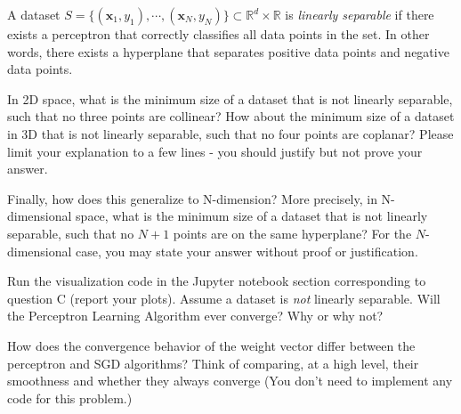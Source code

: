 \begin{problem}[4]
  A dataset $S = \{(\mathbf{x}_1, y_1),\cdots,(\mathbf{x}_N, y_N)\} \subset \mathbb{R}^d \times \mathbb{R}$ is \emph{linearly separable} if there exists a perceptron that correctly classifies all data points in the set. In other words, there exists a hyperplane that separates positive data points and negative data points.

  In 2D space, what is the minimum size of a dataset that is not linearly separable, such that no three points are collinear? How about the minimum size of a dataset in 3D that is not linearly separable, such that no four points are coplanar? Please limit your explanation to a few lines - you should justify but not prove your answer.

  Finally, how does this generalize to N-dimension? More precisely, in N-dimensional space, what is the minimum size of a dataset that is not linearly separable, such that no $N+1$ points are on the same hyperplane? For the $N$-dimensional case, you may state your answer without proof or justification.
\end{problem}
\begin{solution}

\end{solution}

\begin{problem}[2]
  Run the visualization code in the Jupyter notebook section corresponding to question C (report your plots). Assume a dataset is \emph{not} linearly separable. Will the Perceptron Learning Algorithm ever converge? Why or why not?
\end{problem}
\begin{solution}

\end{solution}

\begin{problem}[2]
How does the convergence behavior of the weight vector differ between the perceptron and SGD algorithms? Think of comparing, at a high level, their smoothness and whether they always converge (You don't need to implement any code for this problem.)
\end{problem}
\begin{solution}
\end{solution}

